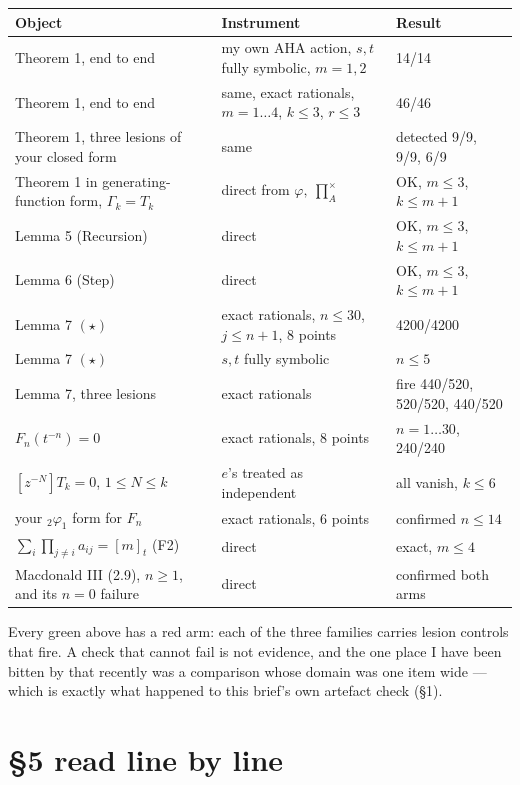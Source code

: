 \documentclass[11pt]{article}
\newcommand{\Fn}{F}
\begin{document}
\begin{center}
\begin{tabular}{@{}p{}p{}p{}@{}}
\toprule
\textbf{Object} & \textbf{Instrument} & \textbf{Result} \\
\midrule
Theorem 1, end to end & my own AHA action, $s,t$ fully symbolic, $m=1,2$ & 14/14 \\
Theorem 1, end to end & same, exact rationals, $m=1\ldots4$, $k\le3$, $r\le3$ & 46/46 \\
Theorem 1, three lesions of your closed form & same & detected 9/9, 9/9, 6/9 \\
Theorem 1 in generating-function form, $\Gamma_k=T_k$ & direct from $\varphi,\ \prod^{\times}_A$ & OK, $m\le3$, $k\le m{+}1$ \\
Lemma 5 (Recursion) & direct & OK, $m\le3$, $k\le m{+}1$ \\
Lemma 6 (Step) & direct & OK, $m\le3$, $k\le m{+}1$ \\
Lemma 7 $(\star)$ & exact rationals, $n\le30$, $j\le n{+}1$, 8 points & 4200/4200 \\
Lemma 7 $(\star)$ & $s,t$ fully symbolic & $n\le5$ \\
Lemma 7, three lesions & exact rationals & fire 440/520, 520/520, 440/520 \\
$\Fn_n(t^{-n})=0$ & exact rationals, 8 points & $n=1\ldots30$, 240/240 \\
$[z^{-N}]T_k=0$, $1\le N\le k$ & $e$'s treated as independent & all vanish, $k\le6$ \\
your $_2\varphi_1$ form for $\Fn_n$ & exact rationals, 6 points & confirmed $n\le14$ \\
$\sum_i\prod_{j\ne i}a_{ij}=[m]_t$ (F2) & direct & exact, $m\le4$ \\
Macdonald III (2.9), $n\ge1$, and its $n=0$ failure & direct & confirmed both arms \\
\bottomrule
\end{tabular}
\end{center}

Every green above has a red arm: each of the three families carries lesion controls that
fire. A check that cannot fail is not evidence, and the one place I have been bitten by
that recently was a comparison whose domain was one item wide --- which is exactly what
happened to this brief's own artefact check (\S1).

\section{\S5 read line by line}
\end{document}
